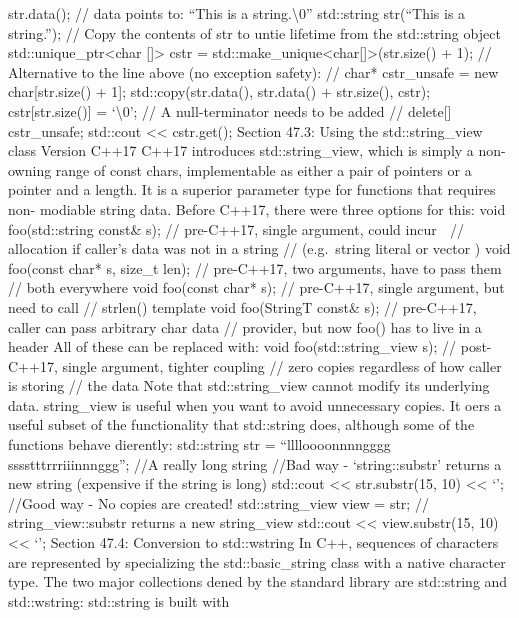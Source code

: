str.data(); // data points to: ``This is a string.\textbackslash0''
std::string str(``This is a string.''); // Copy the contents of str to
untie lifetime from the std::string object
std::unique\_ptr\textless char {[}{]}\textgreater{} cstr =
std::make\_unique\textless char{[}{]}\textgreater(str.size() + 1); //
Alternative to the line above (no exception safety): // char*
cstr\_unsafe = new char{[}str.size() + 1{]}; std::copy(str.data(),
str.data() + str.size(), cstr); cstr{[}str.size(){]} =
`\textbackslash0'; // A null-terminator needs to be added //
delete{[}{]} cstr\_unsafe; std::cout \textless\textless{} cstr.get();
Section 47.3: Using the std::string\_view class Version C++17 C++17
introduces std::string\_view, which is simply a non-owning range of
const chars, implementable as either a pair of pointers or a pointer and
a length. It is a superior parameter type for functions that requires
non- modiable string data. Before C++17, there were three options for
this: void foo(std::string const\& s); // pre-C++17, single argument,
could incur  // allocation if caller's data was not in a string //
(e.g.~string literal or vector ) void foo(const char* s, size\_t len);
// pre-C++17, two arguments, have to pass them // both everywhere void
foo(const char* s); // pre-C++17, single argument, but need to call //
strlen() template void foo(StringT const\& s); // pre-C++17, caller can
pass arbitrary char data // provider, but now foo() has to live in a
header All of these can be replaced with: void foo(std::string\_view s);
// post-C++17, single argument, tighter coupling // zero copies
regardless of how caller is storing // the data Note that
std::string\_view cannot modify its underlying data. string\_view is
useful when you want to avoid unnecessary copies. It oers a useful
subset of the functionality that std::string does, although some of the
functions behave dierently: std::string str = ``lllloooonnnngggg
sssstttrrriiinnnggg''; //A really long string //Bad way -
`string::substr' returns a new string (expensive if the string is long)
std::cout \textless\textless{} str.substr(15, 10) \textless\textless{}
`\n'; //Good way - No copies are created! std::string\_view view = str;
// string\_view::substr returns a new string\_view std::cout
\textless\textless{} view.substr(15, 10) \textless\textless{} `\n';
Section 47.4: Conversion to std::wstring In C++, sequences of characters
are represented by specializing the std::basic\_string class with a
native character type. The two major collections dened by the standard
library are std::string and std::wstring: std::string is built with

